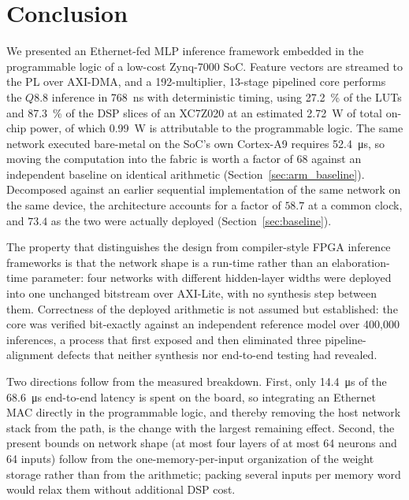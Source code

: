 \documentclass[final,5p,times,twocolumn]{elsarticle}
\begin{document}
\section{Conclusion}
We presented an Ethernet-fed MLP inference framework embedded in the
programmable logic of a low-cost Zynq-7000 SoC. Feature vectors are streamed to
the PL over AXI-DMA, and a 192-multiplier, 13-stage pipelined core performs the
$Q8.8$ inference in \SI{768}{\nano\second} with deterministic timing, using
\SI{27.2}{\percent} of the LUTs and \SI{87.3}{\percent} of the DSP slices of an
XC7Z020 at an estimated \SI{2.72}{\watt} of total on-chip power, of which
\SI{0.99}{\watt} is attributable to the programmable logic. The same network
executed bare-metal on the SoC's own Cortex-A9 requires
\SI{52.4}{\micro\second}, so moving the computation into the fabric is worth a
factor of $68$ against an independent baseline on identical arithmetic
(Section~\ref{sec:arm_baseline}). Decomposed against an earlier sequential
implementation of the same network on the same device, the architecture accounts
for a factor of $58.7$ at a common clock, and $73.4$ as the two were actually
deployed (Section~\ref{sec:baseline}).

The property that distinguishes the design from compiler-style FPGA inference
frameworks is that the network shape is a run-time rather than an
elaboration-time parameter: four networks with different hidden-layer widths
were deployed into one unchanged bitstream over AXI-Lite, with no synthesis step
between them.
Correctness of the deployed arithmetic is not assumed but established: the core
was verified bit-exactly against an independent reference model over 400{,}000
inferences, a process that first exposed and then eliminated three
pipeline-alignment defects that neither synthesis nor end-to-end testing had
revealed.

Two directions follow from the measured breakdown. First, only
\SI{14.4}{\micro\second} of the \SI{68.6}{\micro\second} end-to-end latency is
spent on the board, so integrating an Ethernet MAC directly in the programmable
logic, and thereby removing the host network stack from the path, is the change
with the largest remaining effect. Second, the present bounds on network shape
(at most four layers of at most 64 neurons and 64 inputs) follow from the
one-memory-per-input organization of the weight storage rather than from the
arithmetic; packing several inputs per memory word would relax them without
additional DSP cost.
\end{document}
